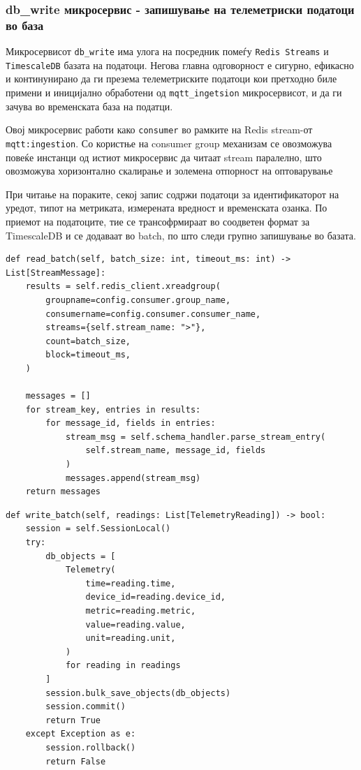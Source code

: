 \subsubsection{db\_write микросервис - запишување на телеметриски податоци во база}

Микросервисот \texttt{db\_write} има улога на посредник помеѓу \texttt{Redis Streams}
и \texttt{TimescaleDB} базата на податоци. Негова главна одговорност е сигурно, ефикасно и
континунирано да ги презема телеметриските податоци кои претходно биле примени и иницијално
обработени од \texttt{mqtt\_ingetsion} микросервисот, и да ги зачува во временската база на податци.

Овој микросервис работи како \texttt{consumer} во рамките на Redis stream-от \texttt{mqtt:ingestion}. Со користње на consumer group механизам се овозможува
повеќе инстанци од истиот микросервис да читаат stream паралелно, што овозможува хоризонтално скалирање и золемена отпорност на оптоварување

При читање на пораките, секој запис содржи податоци за идентификаторот на уредот, типот на метриката, измерената вредност и временската озанка. По приемот на податоците, тие се трансофрмираат во соодветен формат за TimescaleDB и се додаваат во batch, по што следи групно запишување во базата.
\begin{verbatim}
def read_batch(self, batch_size: int, timeout_ms: int) -> List[StreamMessage]:
    results = self.redis_client.xreadgroup(
        groupname=config.consumer.group_name,
        consumername=config.consumer.consumer_name,
        streams={self.stream_name: ">"},
        count=batch_size,
        block=timeout_ms,
    )
    
    messages = []
    for stream_key, entries in results:
        for message_id, fields in entries:
            stream_msg = self.schema_handler.parse_stream_entry(
                self.stream_name, message_id, fields
            )
            messages.append(stream_msg)
    return messages
\end{verbatim}

\begin{verbatim}
def write_batch(self, readings: List[TelemetryReading]) -> bool:
    session = self.SessionLocal()
    try:
        db_objects = [
            Telemetry(
                time=reading.time,
                device_id=reading.device_id,
                metric=reading.metric,
                value=reading.value,
                unit=reading.unit,
            )
            for reading in readings
        ]
        session.bulk_save_objects(db_objects)
        session.commit()
        return True
    except Exception as e:
        session.rollback()
        return False
\end{verbatim}

